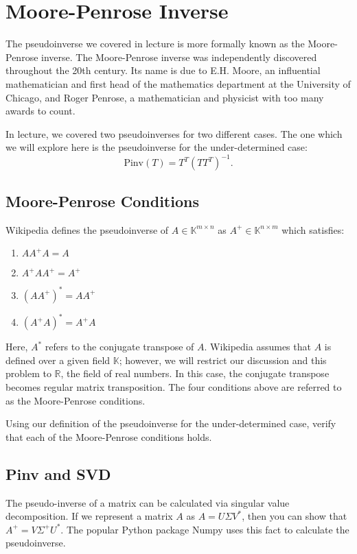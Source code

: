 \section{Moore-Penrose Inverse}
The pseudoinverse we covered in lecture is more formally known as the Moore-Penrose inverse. The Moore-Penrose inverse was independently discovered throughout the 20th century. Its name is due to E.H. Moore, an influential mathematician and first head of the mathematics department at the University of Chicago, and Roger Penrose, a mathematician and physicist with too many awards to count.

In lecture, we covered two pseudoinverses for two different cases. The one which we will explore here is the pseudoinverse for the under-determined case:
\[\textrm{Pinv}(T) = T^T(TT^T)^{-1}.\]

\subsection{Moore-Penrose Conditions}

Wikipedia defines the pseudoinverse of $A\in\mathbb{K}^{m\times n}$ as $A^+ \in \mathbb{K}^{n \times m}$ which satisfies:
\begin{enumerate}
    \item $A A^+ A = A$
    \item $A^+ A A^+ = A^+$
    \item $(A A^+)^* = A A^+$
    \item $(A^+ A)^* = A^+ A$
\end{enumerate}
Here, $A^*$ refers to the conjugate transpose of $A$. Wikipedia assumes that $A$ is defined over a given field $\mathbb{K}$; however, we will restrict our discussion and this problem to $\mathbb{R}$, the field of real numbers. In this case, the conjugate transpose becomes regular matrix transposition. The four conditions above are referred to as the Moore-Penrose conditions.

\bigskip

\noindent Using our definition of the pseudoinverse for the under-determined case, verify that each of the Moore-Penrose conditions holds.

\subsection{Pinv and SVD}
The pseudo-inverse of a matrix can be calculated via singular value decomposition. If we represent a matrix $A$ as $A = U \Sigma V^{*}$, then you can show that $A^{+} = V\Sigma^{+}U^*.$ The popular Python package Numpy uses this fact to calculate the pseudoinverse.

